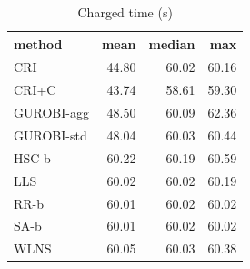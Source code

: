 \begin{table}[htbp]
\centering
\small
\caption{Charged time (s)}
\label{tab:E4b_equal_budgets_60s_b60_time}
\begin{tabular}{lrrr}
\toprule
method & mean & median & max \\
\midrule
CRI & 44.80 & 60.02 & 60.16 \\
CRI+C & 43.74 & 58.61 & 59.30 \\
GUROBI-agg & 48.50 & 60.09 & 62.36 \\
GUROBI-std & 48.04 & 60.03 & 60.44 \\
HSC-b & 60.22 & 60.19 & 60.59 \\
LLS & 60.02 & 60.02 & 60.19 \\
RR-b & 60.01 & 60.02 & 60.02 \\
SA-b & 60.01 & 60.02 & 60.02 \\
WLNS & 60.05 & 60.03 & 60.38 \\
\bottomrule
\end{tabular}
\end{table}
